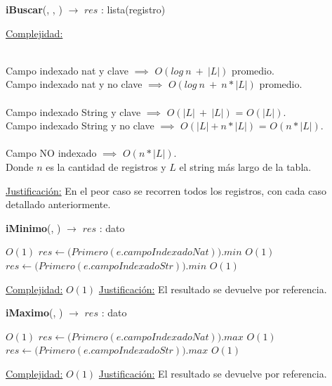 \begin{Algoritmos}
\begin{algorithm}[H]{\textbf{iBuscar}(, , ) $\to$ $res$ : lista(registro)}
\begin{algorithmic}
    \medskip
    \Statex \underline{Complejidad:} {\\
\quad\quad Campo indexado nat y clave $\implies$ $O(log\ n\ +\ |L|)$ promedio.\\
\quad\quad Campo indexado nat y no clave $\implies$ $O(log\ n\ +\ n * |L|)$ promedio.\\
\\
\quad\quad Campo indexado String y clave $\implies$ $O(|L|\ +\ |L|)$ = $O(|L|)$. \\
\quad\quad Campo indexado String y no clave $\implies$ $O(|L|+ n * |L|)$ = $O(n * |L|)$.\\\\
\quad\quad Campo NO indexado $\implies$ $O(n * |L|)$.
\\
\quad\quad Donde $n$ es la cantidad de registros y $L$ el string más largo de la tabla.

}
    \Statex \underline{Justificación:} {En el peor caso se recorren todos los registros, con cada caso detallado anteriormente.}
  \end{algorithmic}
\end{algorithm}


\begin{algorithm}[H]{\textbf{iMinimo}(, ) $\to$ $res$ : dato}
  \begin{algorithmic}
     \Comment $O(1)$
      \State $res \gets \big(Primero(e.campoIndexadoNat)\big).min$ \Comment $O(1)$
    \Else
      \State $res \gets \big(Primero(e.campoIndexadoStr)\big).min$ \Comment $O(1)$
    \EndIf

    \medskip
    \Statex \underline{Complejidad:} {$O(1)$}
    \Statex \underline{Justificación:} {El resultado se devuelve por referencia.}
  \end{algorithmic}
\end{algorithm}

\begin{algorithm}[H]{\textbf{iMaximo}(, ) $\to$ $res$ : dato}
  \begin{algorithmic}
     \Comment $O(1)$
      \State $res \gets \big(Primero(e.campoIndexadoNat)\big).max$ \Comment $O(1)$
    \Else
      \State $res \gets \big(Primero(e.campoIndexadoStr)\big).max$ \Comment $O(1)$
    \EndIf

    \medskip
    \Statex \underline{Complejidad:} {$O(1)$}
    \Statex \underline{Justificación:} {El resultado se devuelve por referencia.}
  \end{algorithmic}
\end{algorithm}









\end{Algoritmos}

